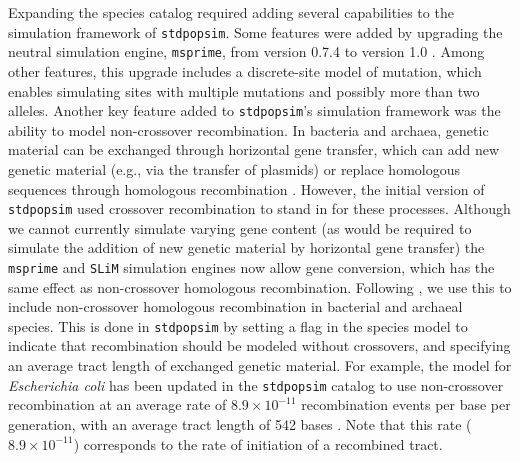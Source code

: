 \documentclass[hidelinks]{article}
\newcommand{\stdpopsim}{\texttt{stdpopsim}\xspace}
\begin{document}
Expanding the species catalog required adding several capabilities to the simulation framework of \stdpopsim.
Some features were added by upgrading the neutral simulation engine, \texttt{msprime}, from version 0.7.4 to version 1.0 \citep{Baumdicker2022}.
Among other features, this upgrade includes a discrete-site model of mutation,
which enables simulating sites with multiple mutations and possibly more than two alleles.
Another key feature added to \stdpopsim's simulation framework was the ability to model non-crossover recombination.
In bacteria and archaea, genetic material can be exchanged through horizontal gene transfer,
which can add new genetic material (e.g., via the transfer of plasmids)
or replace homologous sequences through homologous recombination \citep{Thomas2005,Didelot2010,Gophna2022}.
However, the initial version of \stdpopsim used crossover recombination to stand in for these processes.
Although we cannot currently simulate varying gene content
(as would be required to simulate the addition of new genetic material by horizontal gene transfer)
the \texttt{msprime} and \texttt{SLiM} simulation engines now allow gene conversion,
which has the same effect as non-crossover homologous recombination.
Following \citet{Cury2022}, we use this to include non-crossover homologous recombination in bacterial and archaeal species.
This is done in \stdpopsim by setting a flag in the species model to indicate that recombination should be modeled without crossovers,
and specifying an average tract length of exchanged genetic material.
For example, the model for \textit{Escherichia coli} has been updated in the \stdpopsim catalog to use non-crossover recombination at an average rate of $8.9\times 10^{-11}$ recombination events per base per generation,
with an average tract length of 542 bases \citep{Wielgoss2011,Didelot2012}.
Note that this rate ($8.9\times 10^{-11}$) corresponds to the rate of initiation of a recombined tract.
\end{document}
